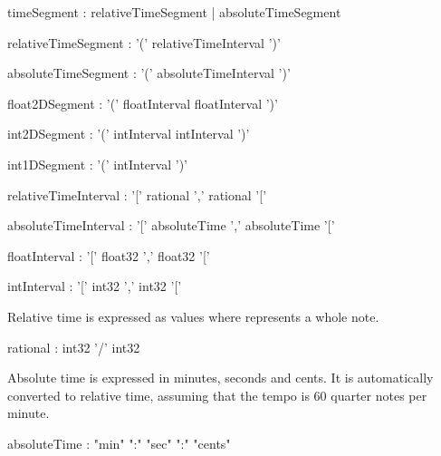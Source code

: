 \documentclass[a4paper,twoside]{report}
\begin{document}
\begin{rail}
timeSegment : relativeTimeSegment | absoluteTimeSegment
\end{rail}

\begin{rail}
relativeTimeSegment : '(' relativeTimeInterval ')' 
\end{rail}
\begin{rail}
absoluteTimeSegment : '(' absoluteTimeInterval ')' 
\end{rail}

\begin{rail}
float2DSegment : '(' floatInterval floatInterval ')' 
\end{rail}
\begin{rail}
int2DSegment : '(' intInterval intInterval ')' 
\end{rail}
\begin{rail}
int1DSegment : '(' intInterval ')' 
\end{rail}


\begin{rail}
relativeTimeInterval : '[' rational ',' rational '[' 
\end{rail}
\begin{rail}
absoluteTimeInterval : '[' absoluteTime ',' absoluteTime '[' 
\end{rail}
\begin{rail}
floatInterval : '[' float32 ',' float32 '['
\end{rail}
\begin{rail}
intInterval : '[' int32 ',' int32 '['
\end{rail}

Relative time is expressed as  values where  represents a whole note.

\begin{rail}
rational : int32 '/' int32
\end{rail}

Absolute time is expressed in minutes, seconds and cents. It is automatically converted to relative time, assuming that the 
tempo is 60 quarter notes per minute.
\begin{rail}
absoluteTime : "min" ":" "sec" ":" "cents"
\end{rail}
\end{document}
